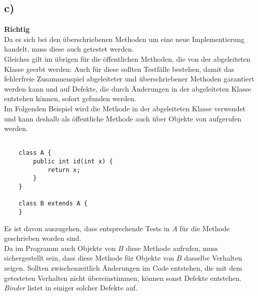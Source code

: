\subsection*{c)}



\textbf{Richtig}\\
Da es sich bei den überschriebenen Methoden um eine neue Implementierung handelt, muss diese auch getestet werden.\\

\noindent
Gleiches gilt im übrigen für die öffentlichen Methoden, die von der abgeleiteten Klasse geerbt werden: Auch für diese sollten Testfälle bestehen, damit das fehlerfreie Zusammenspiel abgeleiteter und überschriebener Methoden garantiert werden kann und auf Defekte, die durch Änderungen in der abgeleiteten Klasse entstehen können, sofort gefunden werden.\\
Im Folgenden Beispiel wird die Methode  in der abgeleiteten Klasse verwendet und kann deshalb als öffentliche Methode auch über Objekte von  aufgerufen werden.\\

\begin{verbatim}

    class A {
        public int id(int x) {
            return x;
        }
    }

    class B extends A {
    }
\end{verbatim}

\noindent
Es ist davon auszugehen, dass entsprechende Tests in $A$ für die Methode geschrieben worden sind.\\
Da im Programm auch Objekte von $B$ diese Methode aufrufen, muss sichergestellt sein, dass diese Methode für Objekte von $B$ dasselbe Verhalten zeigen.
Sollten zwischenzeitlich Änderungen im Code entstehen, die mit dem getesteten Verhalten nicht übereinstimmen, können sonst Defekte entstehen. \textit{Binder} listet in \cite[Table 17.2, 843]{Bin99} einiger solcher Defekte auf.

